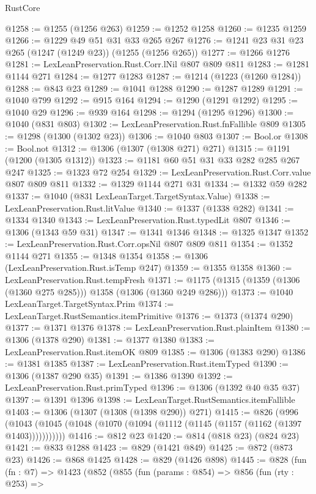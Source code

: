 \begin{lexlean}{RustCore}
\begin{coremodule}
@1258 := @1255 (@1256 @263)
@1259 := @1252 @1258
@1260 := @1235 @1259
@1266 := @1229 @49 @51 @31 @33 @265 @267
@1276 := @1241 @23 @31 @23 @265 (@1247 (@1249 @23)) (@1255 (@1256 @265))
@1277 := @1266 @1276
@1281 := LexLeanPreservation.Rust.Corr.lNil @807 @809 @811
@1283 := @1281 @1144 @271
@1284 := @1277 @1283
@1287 := @1214 (@1223 (@1260 @1284))
@1288 := @843 @23
@1289 := @1041 @1288
@1290 := @1287 @1289
@1291 := @1040 @799
@1292 := @915 @164
@1294 := @1290 (@1291 @1292)
@1295 := @1040 @29
@1296 := @939 @164
@1298 := @1294 (@1295 @1296)
@1300 := @1040 (@831 @803)
@1302 := LexLeanPreservation.Rust.fnFallible @809
@1305 := @1298 (@1300 (@1302 @23))
@1306 := @1040 @803
@1307 := Bool.or
@1308 := Bool.not
@1312 := @1306 (@1307 (@1308 @271) @271)
@1315 := @1191 (@1200 (@1305 @1312))
@1323 := @1181 @60 @51 @31 @33 @282 @285 @267 @247
@1325 := @1323 @72 @254
@1329 := LexLeanPreservation.Rust.Corr.value @807 @809 @811
@1332 := @1329 @1144 @271 @31
@1334 := @1332 @59 @282
@1337 := @1040 (@831 LexLeanTarget.TargetSyntax.Value)
@1338 := LexLeanPreservation.Rust.litValue
@1340 := @1337 (@1338 @282)
@1341 := @1334 @1340
@1343 := LexLeanPreservation.Rust.typedLit @807
@1346 := @1306 (@1343 @59 @31)
@1347 := @1341 @1346
@1348 := @1325 @1347
@1352 := LexLeanPreservation.Rust.Corr.opsNil @807 @809 @811
@1354 := @1352 @1144 @271
@1355 := @1348 @1354
@1358 := @1306 (LexLeanPreservation.Rust.isTemp @247)
@1359 := @1355 @1358
@1360 := LexLeanPreservation.Rust.tempFresh
@1371 := @1175 (@1315 (@1359 (@1306 (@1360 @275 @285))) @1358 (@1306 (@1360 @249 @286)))
@1373 := @1040 LexLeanTarget.TargetSyntax.Prim
@1374 := LexLeanTarget.RustSemantics.itemPrimitive
@1376 := @1373 (@1374 @290)
@1377 := @1371 @1376
@1378 := LexLeanPreservation.Rust.plainItem
@1380 := @1306 (@1378 @290)
@1381 := @1377 @1380
@1383 := LexLeanPreservation.Rust.itemOK @809
@1385 := @1306 (@1383 @290)
@1386 := @1381 @1385
@1387 := LexLeanPreservation.Rust.itemTyped
@1390 := @1306 (@1387 @290 @35)
@1391 := @1386 @1390
@1392 := LexLeanPreservation.Rust.primTyped
@1396 := @1306 (@1392 @40 @35 @37)
@1397 := @1391 @1396
@1398 := LexLeanTarget.RustSemantics.itemFallible
@1403 := @1306 (@1307 (@1308 (@1398 @290)) @271)
@1415 := @826
    (@996 (@1043 (@1045 (@1048 (@1070 (@1094 (@1112 (@1145 (@1157 (@1162 (@1397 @1403)))))))))))
@1416 := @812 @23
@1420 := @814 (@818 @23) (@824 @23)
@1421 := @833 @1288
@1423 := @829 (@1421 @849)
@1425 := @872 (@873 @23)
@1426 := @868 @1425
@1428 := @829 (@1426 @898)
@1445 := @828
    (fun (fn : @7) =>
    @1423
      (@852
        (@855
          (fun (params : @854) =>
          @856
            (fun (rty : @253) =>

\end{coremodule}
\end{lexlean}
